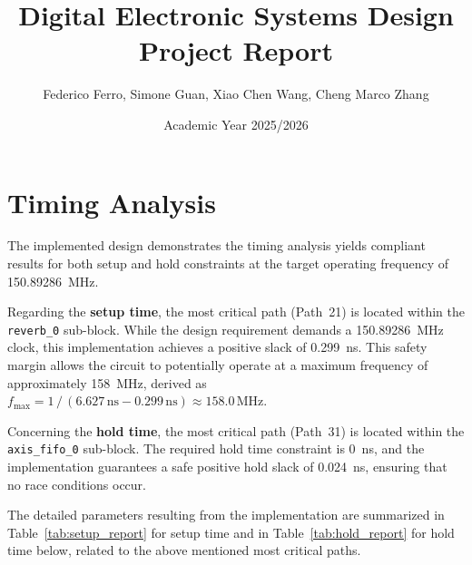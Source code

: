 \documentclass[11pt]{article}
\title{Digital Electronic Systems Design Project Report}
\author{Federico Ferro, Simone Guan, Xiao Chen Wang, Cheng Marco Zhang}
\date{Academic Year 2025/2026}
\begin{document}
\maketitle


\section*{Timing Analysis}

The implemented design demonstrates the timing analysis yields compliant results for both setup and hold constraints at the target operating frequency of 150.89286~MHz.

Regarding the \textbf{setup time}, the most critical path (Path~21) is located within the 
\texttt{reverb\_0} sub-block. While the design requirement demands a 150.89286~MHz clock, this implementation achieves a positive slack of 0.299~ns. This safety margin allows the circuit to potentially operate at a maximum frequency of approximately 158~MHz, derived as $f_{\max} = 1\,/\,(6.627\,\mathrm{ns} - 0.299\,\mathrm{ns}) \approx 158.0\,\mathrm{MHz}$.

Concerning the \textbf{hold time}, the most critical path (Path~31) is located within the 
\texttt{axis\_fifo\_0} sub-block. The required hold time constraint is 0~ns, and the implementation guarantees a safe positive hold slack of 0.024~ns, ensuring that no race 
conditions occur.

The detailed parameters resulting from the implementation are summarized in Table~\ref{tab:setup_report} for setup time and in Table~\ref{tab:hold_report} for hold time below, related to the above mentioned most critical paths.
\end{document}
